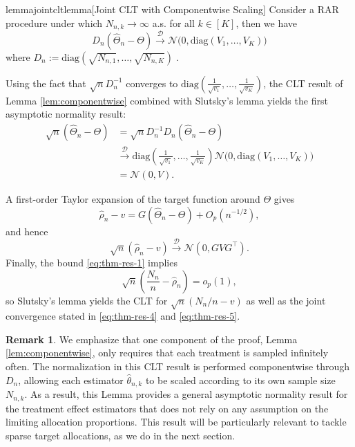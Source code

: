 \documentclass[11pt]{article}
\theoremstyle{plain}
\theoremstyle{definition}
\newtheorem{remark}[theorem]{Remark}
\begin{document}
		\begin{restatable}{lemma}{jointcltlemma}[Joint CLT with Componentwise Scaling]\label{lem:componentwise} 
			Consider a RAR procedure under which $N_{n,k}\to\infty$ a.s. for all $k \in [K]$, then we have
			\[
			D_n(\hat\Theta_n-\Theta)\xrightarrow{\mathcal{D}}
			\mathcal N\!\big(0,\mathrm{diag}\left(V_1,\dots,V_K\right)\big)
			\]
			where $D_n:=\mathrm{diag}(\sqrt{N_{n,1}},\dots,\sqrt{N_{n,K}})\;.$
		\end{restatable}
		
		Using the fact that \(\sqrt n D_n^{-1}\) converges to \(\mathrm{diag}\left(\frac{1}{\sqrt{v_1}},\ldots,\frac{1}{\sqrt{v_K}}\right)\), the CLT result of Lemma \ref{lem:componentwise} combined with Slutsky's lemma yields the first asymptotic normality result:
		\begin{align*}
			\sqrt n(\hat\Theta_n-\Theta) &= \sqrt n D_n^{-1} D_n(\hat\Theta_n-\Theta)\\
			&\xrightarrow{\mathcal{D}}\mathrm{diag}\left(\frac{1}{\sqrt{v_1}},\ldots,\frac{1}{\sqrt{v_K}}\right) \mathcal N\!\big(0,\mathrm{diag}\left(V_1,\dots,V_K\right)\big)\\ 
			&= \mathcal N(0,V).
		\end{align*}

	
	A first-order Taylor expansion of the target function around $\Theta$ gives
	\[
	\hat\rho_n-v
	= G(\hat\Theta_n-\Theta) + O_p(n^{-1/2}),
	\]
	and hence
	\[
	\sqrt n(\hat\rho_n-v)\xrightarrow{\mathcal{D}}\mathcal N(0,GVG^\top).
	\]
	Finally, the bound \eqref{eq:thm-res-1} implies
	\[
	\sqrt n\!\left(\frac{N_n}{n}-\hat\rho_n\right)=o_p(1),
	\]
	so Slutsky’s lemma yields the CLT for $\sqrt n(N_n/n-v)$ as well as the joint convergence stated in \eqref{eq:thm-res-4} and \eqref{eq:thm-res-5}.
	
	\begin{remark}
			We emphasize that one component of the proof, Lemma \ref{lem:componentwise}, only requires that each treatment is sampled
			infinitely often. The normalization in this CLT result is performed componentwise through
			\(D_n\), allowing each estimator \(\hat\theta_{n,k}\) to be scaled according
			to its own sample size \(N_{n,k}\). As a result, this Lemma provides a general asymptotic normality result for the treatment effect estimators that
			does not rely on any assumption on the limiting allocation proportions. This result will be particularly relevant to tackle sparse target allocations, as we do in the next section.
	\end{remark}
	
\end{document}
